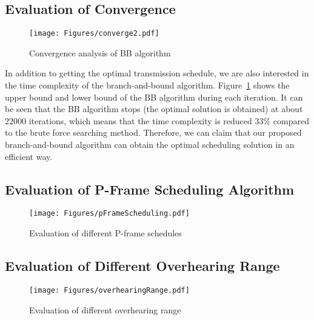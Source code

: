 \subsection{Evaluation of Convergence}
\begin{figure}
\begin{center}
\texttt{[image: Figures/converge2.pdf]}
\caption{\label{fig::evaBBConvergence}Convergence analysis of BB algorithm}
\end{center}
\end{figure}
In addition to getting the optimal transmission schedule, we are also interested in the time complexity of the branch-and-bound algorithm.
Figure~\ref{fig::evaBBConvergence} shows the upper bound and lower bound of the BB algorithm during each iteration.
It can be seen that the BB algorithm stops (the optimal solution is obtained) at about  $22000$ iterations, which means that the time complexity is reduced $33\%$ compared to the brute force searching method.
Therefore, we can claim that our proposed branch-and-bound algorithm can obtain the optimal scheduling solution in an efficient way.
%
\subsection{Evaluation of P-Frame Scheduling Algorithm}
\begin{figure}
\begin{center}
\texttt{[image: Figures/pFrameScheduling.pdf]}
\caption{\label{fig::evaPFrameScheduling}Evaluation of different P-frame schedules}
\end{center}
\end{figure}
%
\subsection{Evaluation of Different Overhearing Range}
\begin{figure}
\begin{center}
\texttt{[image: Figures/overhearingRange.pdf]}
\caption{\label{fig::evaOverRange}Evaluation of different overhearing range}
\end{center}
\end{figure}